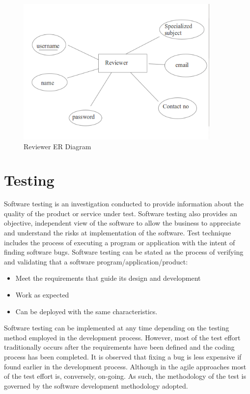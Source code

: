 \documentclass[12pt]{report}
\begin{document}
\begin{figure}[H]
 \centering
 \includegraphics[width=10cm]{./er_reviewer.png}
 \caption{Reviewer ER Diagram\label{fig:er_reviewer}}
\end{figure}

\chapter{Testing}
Software testing is an investigation conducted to provide information about the quality of the 
product or service under test. Software testing also provides an objective, independent view 
of the software to allow the business to appreciate and understand the risks at implementation 
of the software. Test technique includes the process of executing a program or application 
with the intent of finding software bugs. 
Software testing can be stated as the process of verifying and validating that a software 
program/application/product: 

\begin{itemize}
\item Meet the requirements that guide its design and development
\item Work as expected
\item Can be deployed with the same characteristics.
\end{itemize}

Software testing can be implemented at any time depending on the testing method employed 
in the development process. However, most of the test effort traditionally occurs after the 
requirements have been defined and the coding process has been completed. It is observed 
that fixing a bug is less expensive if found earlier in the development process. Although in 
the agile approaches most of the test effort is, conversely, on-going. As such, the 
methodology of the test is governed by the software development methodology adopted. 
\end{document}
